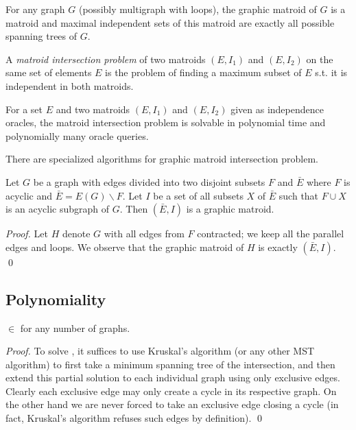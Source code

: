 \begin{fact}
For any graph $G$ (possibly multigraph with loops), the graphic matroid of $G$ is a matroid and maximal independent sets of this matroid are exactly all possible spanning trees of $G$. 
\end{fact}

\begin{definition}
A {\em matroid intersection problem} of two matroids $(E,I_1)$ and $(E,I_2)$ on the same set of elements $E$ is the problem of finding a maximum subset of $E$ s.t. it is independent in both matroids. 
\end{definition}

\begin{fact}
For a set $E$ and two matroids $(E,I_1)$ and $(E,I_2)$ given as independence oracles, the matroid intersection problem is solvable in polynomial time and polynomially many oracle queries. 
\end{fact}

\begin{fact}
There are specialized algorithms for graphic matroid intersection problem. 
\end{fact}

\begin{lemma}\label{lem:grmatroid}
Let $G$ be a graph with edges divided into two disjoint subsets $F$ and $\bar{E}$ where $F$ is acyclic and $\bar{E} = E(G) \backslash F$. Let $I$ be a set of all subsets $X$ of $\bar{E}$ such that $F \cup X$ is an acyclic subgraph of $G$. Then $(\bar{E},I)$ is a graphic matroid. 
\end{lemma}
\begin{proof}
Let $H$ denote $G$ with all edges from $F$ contracted; we keep all the parallel edges and loops. We observe that the graphic matroid of $H$ is exactly $(\bar{E},I)$. \qed
\end{proof}

\subsection{Polynomiality}

\begin{theorem}\label{thm:SSTinP}
\SST $\in$ \PP for any number of graphs. 
\end{theorem}
\begin{proof}
To solve \SST, it suffices to use Kruskal's algorithm (or any other MST algorithm) to first take a minimum spanning tree of the intersection, and then extend this partial solution to each individual graph using only exclusive edges. Clearly each exclusive edge may only create a cycle in its respective graph. On the other hand we are never forced to take an exclusive edge closing a cycle (in fact, Kruskal's algorithm refuses such edges by definition). \qed
\end{proof}


